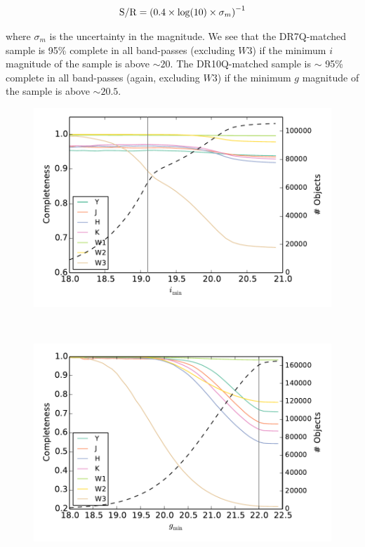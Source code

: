 \begin{eqnarray}
  {\rm S/R} = \left( 0.4 \times {\rm log}(10) \times \sigma_m \right)^{-1}
\end{eqnarray}

where $\sigma_m$ is the uncertainty in the magnitude. We see that the DR7Q-matched sample is 95\% complete in all band-passes (excluding $W3$) if the minimum $i$ magnitude of the sample is above $\sim 20$. The DR10Q-matched sample is $\sim$ 95\% complete in all band-passes (again, excluding $W3$) if the minimum $g$ magnitude of the sample is above $\sim 20.5$. 

\begin{figure}
  \centering
  \begin{minipage}[b]{0.75\textwidth}
    \includegraphics[width=\textwidth]{figures/chapter06/dr7completeness_v2}
  \end{minipage} \\
  \begin{minipage}[b]{0.75\textwidth}
    \includegraphics[width=\textwidth]{figures/chapter06/dr10completeness_v2}

\end{minipage}
\end{figure}
